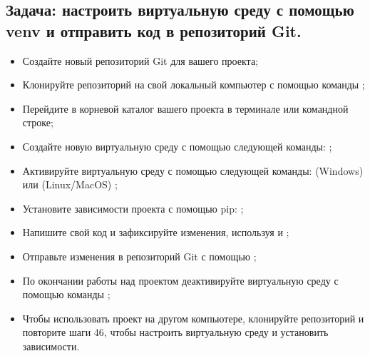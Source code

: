 \documentclass[letterpaper,10pt,russian]{sphinxmanual}
\begin{document}
\subsection{Задача: настроить виртуальную среду с помощью venv и отправить код в репозиторий Git.}
\label{\detokenize{educational_materials/path_venv/exercises:venv-git}}\begin{itemize}
\item {} 
\sphinxAtStartPar
Создайте новый репозиторий Git для вашего проекта;

\item {} 
\sphinxAtStartPar
Клонируйте репозиторий на свой локальный компьютер с помощью команды ;

\item {} 
\sphinxAtStartPar
Перейдите в корневой каталог вашего проекта в терминале или командной строке;

\item {} 
\sphinxAtStartPar
Создайте новую виртуальную среду с помощью следующей команды: ;

\item {} 
\sphinxAtStartPar
Активируйте виртуальную среду с помощью следующей команды: (Windows)  или (Linux/MacOS) ;

\item {} 
\sphinxAtStartPar
Установите зависимости проекта с помощью pip: ;

\item {} 
\sphinxAtStartPar
Напишите свой код и зафиксируйте изменения, используя  и ;

\item {} 
\sphinxAtStartPar
Отправьте изменения в репозиторий Git с помощью ;

\item {} 
\sphinxAtStartPar
По окончании работы над проектом деактивируйте виртуальную среду с помощью команды ;

\item {} 
\sphinxAtStartPar
Чтобы использовать проект на другом компьютере, клонируйте репозиторий и повторите шаги 4\textendash{}6, чтобы настроить виртуальную среду и установить зависимости.

\end{itemize}
\end{document}
